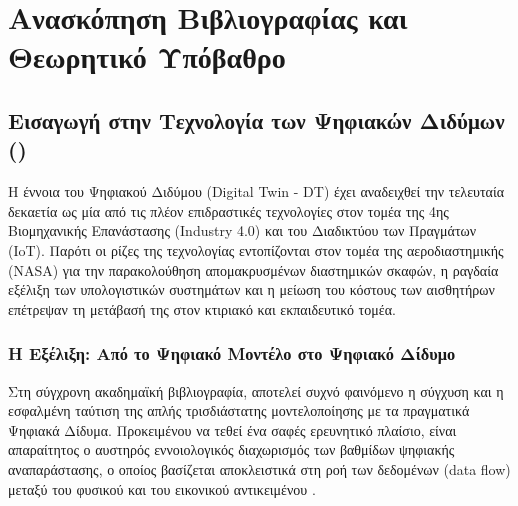 \chapter{Ανασκόπηση Βιβλιογραφίας και Θεωρητικό Υπόβαθρο}

\section{Εισαγωγή στην Τεχνολογία των Ψηφιακών Διδύμων ()}
Η έννοια του Ψηφιακού Διδύμου (Digital Twin - DT) έχει αναδειχθεί την τελευταία δεκαετία ως μία από τις πλέον επιδραστικές τεχνολογίες στον τομέα της 4ης Βιομηχανικής Επανάστασης (Industry 4.0) και του Διαδικτύου των Πραγμάτων (IoT). Παρότι οι ρίζες της τεχνολογίας εντοπίζονται στον τομέα της αεροδιαστημικής (NASA) για την παρακολούθηση απομακρυσμένων διαστημικών σκαφών, η ραγδαία εξέλιξη των υπολογιστικών συστημάτων και η μείωση του κόστους των αισθητήρων επέτρεψαν τη μετάβασή της στον κτιριακό και εκπαιδευτικό τομέα.

\subsection{Η Εξέλιξη: Από το Ψηφιακό Μοντέλο στο Ψηφιακό Δίδυμο}
Στη σύγχρονη ακαδημαϊκή βιβλιογραφία, αποτελεί συχνό φαινόμενο η σύγχυση και η εσφαλμένη ταύτιση της απλής τρισδιάστατης μοντελοποίησης με τα πραγματικά Ψηφιακά Δίδυμα. Προκειμένου να τεθεί ένα σαφές ερευνητικό πλαίσιο, είναι απαραίτητος ο αυστηρός εννοιολογικός διαχωρισμός των βαθμίδων ψηφιακής αναπαράστασης, ο οποίος βασίζεται αποκλειστικά στη ροή των δεδομένων (data flow) μεταξύ του φυσικού και του εικονικού αντικειμένου \cite{Kritzinger2018}.


